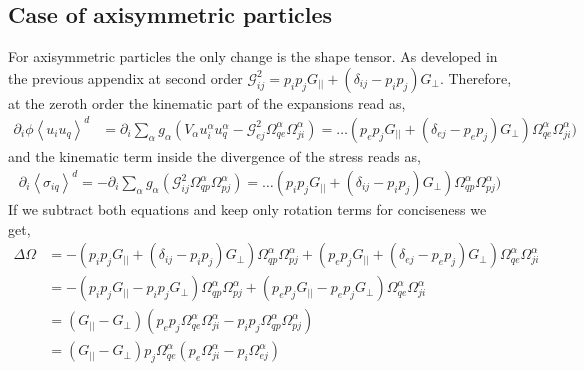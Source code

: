 {\subsection{Case of axisymmetric particles}

For axisymmetric particles the only change is the shape tensor.
As developed in the previous appendix at second order $\mathcal{G}^2_{ij} = p_ip_j G_{||} + (\delta_{ij} - p_ip_j) G_{\bot}$.
Therefore, at the zeroth order the kinematic part of the expansions read as,
\begin{align}
    \partial_{i} \phi \left< u_{i} u_q\right>^d
    &=
    \partial_{i}
    \sum_\alpha  g_\alpha
    \left(
        V_\alpha u^\alpha_{i} u^\alpha_q
        -\mathcal{G}_{ej}^{2}\Omega_{qe}^\alpha \Omega_{ji}^\alpha
    \right)
    = \ldots
    (p_ep_j G_{||} + (\delta_{ej} - p_ep_j)G_{\bot})\Omega_{qe}^\alpha \Omega_{ji}^\alpha)
\end{align}
and the kinematic term inside the divergence of the stress reads as,
\begin{align}
    \partial_i \left<\sigma_{iq}\right>^d =
    -\partial_{i}
    \sum_{\alpha}
    g_{\alpha}
    (\mathcal{G}_{ij}^{2}\Omega_{qp}^\alpha \Omega_{pj}^\alpha )
    =\ldots
    (p_ip_j G_{||} + (\delta_{ij} - p_ip_j) G_{\bot})\Omega_{qp}^\alpha \Omega_{pj}^\alpha)
\end{align}
If we subtract both equations and keep only rotation terms for conciseness we get,
\begin{align}
    \Delta \Omega
    &= - (p_ip_j G_{||} + (\delta_{ij} - p_ip_j) G_{\bot})\Omega_{qp}^\alpha \Omega_{pj}^\alpha
    + (p_ep_j G_{||} + (\delta_{ej} - p_ep_j)G_{\bot})\Omega_{qe}^\alpha \Omega_{ji}^\alpha\\
    &=- (p_ip_j G_{||} - p_ip_j  G_{\bot})\Omega_{qp}^\alpha \Omega_{pj}^\alpha
    + (p_ep_j G_{||} - p_ep_j G_{\bot})\Omega_{qe}^\alpha \Omega_{ji}^\alpha\\
    &= (G_{||} - G_{\bot})
    (p_ep_j\Omega_{qe}^\alpha \Omega_{ji}^\alpha
    - p_ip_j \Omega_{qp}^\alpha \Omega_{pj}^\alpha)\\
    &= (G_{||} - G_{\bot}) p_j \Omega_{qe}^\alpha
    (p_e \Omega_{ji}^\alpha
    - p_i \Omega_{ej}^\alpha)\\

\end{align}}
